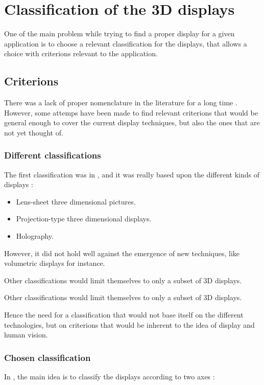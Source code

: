 \section{Classification of the 3D displays}
One of the main problem while trying to find a proper \gls{display} for a given application is to choose a relevant classification for the displays, that allows a choice with criterions relevant to the application.
\subsection{Criterions}
There was a lack of proper nomenclature in the literature for a long time \cite{pimenta2012comprehensive}. However, some attemps have been made to find relevant criterions that would be general enough to cover the current display techniques, but also the ones that are not yet thought of.

\subsubsection{Different classifications}
The first classification was in \cite{okoshi1976three}, and it was really based upon the different kinds of displays : 
\begin{itemize}
\item Lens-sheet three dimensional pictures.
\item Projection-type three dimensional displays.
\item Holography.
\end{itemize}

However, it did not hold well against the emergence of new techniques, like volumetric displays for instance.


Other classifications %
would limit themselves to only a subset of 3D displays.

Other classifications \cite{refnécessaire} would limit themselves to only a subset of 3D displays.



Hence the need for a classification that would not base itself on the different technologies, but on criterions that would be inherent to the idea of display and human vision.

\subsubsection{Chosen classification}
In \cite{pimenta2012comprehensive}, the main idea is to classify the displays according to two axes : 


